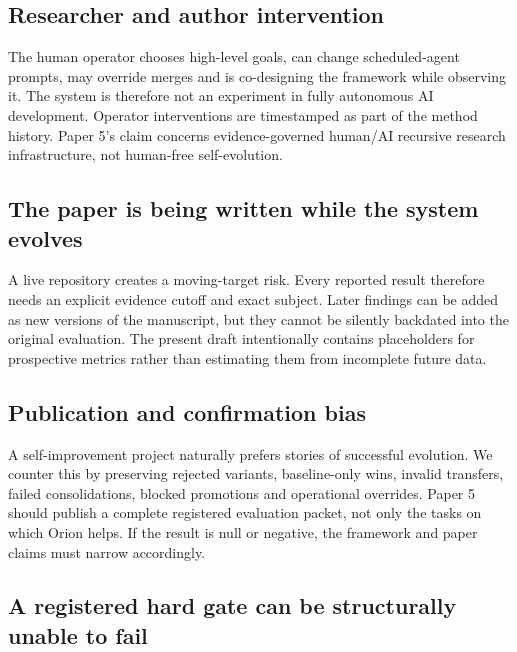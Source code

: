 \subsection{Researcher and author intervention}

The human operator chooses high-level goals, can change scheduled-agent prompts, may override merges and is co-designing the framework while observing it. The system is therefore not an experiment in fully autonomous AI development. Operator interventions are timestamped as part of the method history. Paper 5's claim concerns evidence-governed human/AI recursive research infrastructure, not human-free self-evolution.

\subsection{The paper is being written while the system evolves}

A live repository creates a moving-target risk. Every reported result therefore needs an explicit evidence cutoff and exact subject. Later findings can be added as new versions of the manuscript, but they cannot be silently backdated into the original evaluation. The present draft intentionally contains placeholders for prospective metrics rather than estimating them from incomplete future data.

\subsection{Publication and confirmation bias}

A self-improvement project naturally prefers stories of successful evolution. We counter this by preserving rejected variants, baseline-only wins, invalid transfers, failed consolidations, blocked promotions and operational overrides. Paper 5 should publish a complete registered evaluation packet, not only the tasks on which Orion helps. If the result is null or negative, the framework and paper claims must narrow accordingly.

\subsection{A registered hard gate can be structurally unable to fail}

